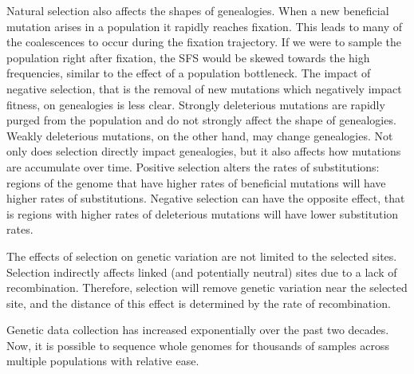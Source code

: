 Natural selection also affects the shapes of genealogies.
When a new beneficial mutation arises in a population it rapidly reaches fixation.
This leads to many of the coalescences to occur during the fixation trajectory.
If we were to sample the population right after fixation,
the SFS would be skewed towards the high frequencies, similar to the effect of a population bottleneck.
The impact of negative selection, that is the removal of new mutations which negatively impact fitness, on genealogies is less clear.
Strongly deleterious mutations are rapidly purged from the population and do not strongly affect the shape of genealogies.
Weakly deleterious mutations, on the other hand, may change genealogies. %
Not only does selection directly impact genealogies, but it also affects how mutations are accumulate over time.
Positive selection alters the rates of substitutions: regions of the genome that have higher rates of beneficial mutations will have higher rates of substitutions.
Negative selection can have the opposite effect, that is regions with higher rates of deleterious mutations will have lower substitution rates.

The effects of selection on genetic variation are not limited to the selected sites.
Selection indirectly affects linked (and potentially neutral) sites due to a lack of recombination.
Therefore, selection will remove genetic variation near the selected site, and the distance of this effect is determined by the rate of recombination.



Genetic data collection has increased exponentially over the past two decades.
Now, it is possible to sequence whole genomes for thousands of samples across multiple populations with relative ease.






